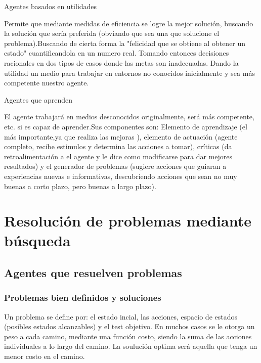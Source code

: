 \documentclass{article}
\begin{document}
\vspace{5mm}

Agentes basados en utilidades 

\vspace{5mm}


Permite que mediante medidas de eficiencia se logre la mejor solución, buscando la solución que sería preferida (obviando que sea una que solucione el problema).Buscando de cierta forma la "felicidad que se obtiene al obtener un estado" cuantificandola en un numero real. Tomando entonces decisiones racionales en dos tipos de casos donde las metas son inadecuadas. Dando la utilidad un medio para trabajar en entornos no conocidos inicialmente y sea más competente nuestro agente.

\vspace{5mm}

Agentes que aprenden 

\vspace{5mm}

El agente trabajará en medios desconocidos originalmente, será más competente, etc. si es capaz de aprender.Sus componentes son: Elemento de aprendizaje (el más importante,ya que realiza las mejoras ), elemento de actuación (agente completo, recibe estimulos y determina las acciones a tomar), críticas (da retroalimentación a el agente y le dice como modificarse para dar mejores resultados) y el generador de problemas (sugiere acciones que guiaran a experiencias nuevas e informativas, descubriendo acciones que sean no muy buenas a corto plazo, pero buenas a largo plazo).



\section{Resolución de problemas mediante búsqueda}

\subsection{Agentes que resuelven problemas}
\subsubsection{Problemas bien definidos y soluciones}

Un problema se define por: el estado incial, las acciones, espacio de estados (posibles estados alcanzables) y el test objetivo. En muchos casos se le otorga un peso a cada camino, mediante una función costo, siendo la suma de las acciones individuales a lo largo del camino. La soulución optima será aquella que tenga un menor costo en el camino.
\end{document}
